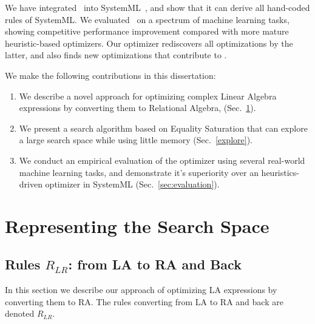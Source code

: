 We have integrated \sys\ into
SystemML~\cite{DBLP:reference/bdt/Boehm19}, and show that it can
derive all hand-coded rules of SystemML.  We evaluated \sys\ on a
spectrum of machine learning tasks, showing competitive performance
improvement compared with more mature heuristic-based optimizers. Our
optimizer rediscovers all optimizations by the latter, and also finds
new optimizations that contribute to .

We make the following contributions in this dissertation:
\begin{enumerate}
\item We describe a novel approach for optimizing complex Linear
  Algebra expressions by converting them to Relational Algebra,  (Sec.~\ref{sec:la:to:ra}).
\item We present a search algorithm based on Equality Saturation that
  can explore a large search space while using little memory (Sec.~\ref{explore}).
\item We conduct an empirical evaluation of the optimizer using
  several real-world machine learning tasks, and demonstrate it's
  superiority over an heuristics-driven optimizer in SystemML
  (Sec.~\ref{sec:evaluation}).
\end{enumerate}{}

\section{Representing the Search Space} \label{sec:la:to:ra}

\subsection{Rules \texorpdfstring{$R_{LR}$}{R\_LR}: from  LA to RA and Back}
In this section we describe our approach of optimizing LA expressions
by converting them to RA.  The rules converting from LA to RA and back
are denoted $R_{LR}$.


